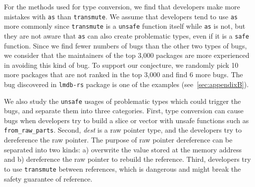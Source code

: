 \begin{appendix}
\vspace{0.05in}
For the methods used for type conversion, we find that developers make more mistakes with \texttt{as} than \texttt{transmute}. 
We assume that developers tend to use \texttt{as} more commonly since \texttt{transmute} is a \texttt{unsafe} function itself while \texttt{as} is not, 
but they are not aware that \texttt{as} can also create 
problematic types,  
even if it is a \texttt{safe} function.
Since we find fewer numbers of \bthree bugs than the other two types of bugs, we consider that the maintainers of the top 3,000 packages are more experienced in avoiding this kind of bug. To support our conjecture, we randomly pick 10 more packages that are not ranked in the top 3,000 and find 6 more \bthree bugs. The bug discovered in \texttt{lmdb-rs} package is one of the examples (see~\autoref{sec:appendixB}).

\vspace{0.05in}
We also study the \texttt{unsafe} usages of problematic types which could trigger the bugs, and separate them into three categories. 
First, type conversion can cause bugs when developers try to build a slice or vector with unsafe functions such as \texttt{from\_raw\_parts}. 
Second, \textit{dest} is a raw pointer type, and the developers try to dereference the raw pointer. The purpose of raw pointer dereference can be separated into two kinds: a) overwrite the value stored at the memory address and b) dereference the raw pointer to rebuild the reference. 
Third, developers try to use \texttt{transmute} between references, which is dangerous and might break the safety guarantee of reference.



\end{appendix}
